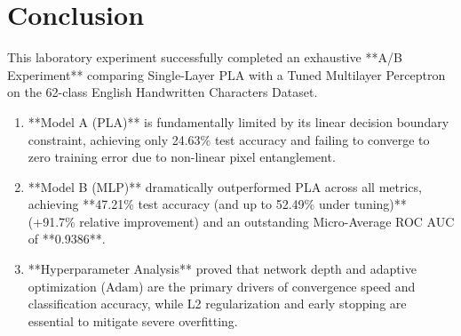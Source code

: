 \documentclass[12pt,a4paper]{article}
\begin{document}
\section{Conclusion}
This laboratory experiment successfully completed an exhaustive **A/B Experiment** comparing Single-Layer PLA with a Tuned Multilayer Perceptron on the 62-class English Handwritten Characters Dataset.
\begin{enumerate}[noitemsep]
    \item **Model A (PLA)** is fundamentally limited by its linear decision boundary constraint, achieving only 24.63\% test accuracy and failing to converge to zero training error due to non-linear pixel entanglement.
    \item **Model B (MLP)** dramatically outperformed PLA across all metrics, achieving **47.21\% test accuracy (and up to 52.49\% under tuning)** (+91.7\% relative improvement) and an outstanding Micro-Average ROC AUC of **0.9386**.
    \item **Hyperparameter Analysis** proved that network depth and adaptive optimization ($\text{Adam}$) are the primary drivers of convergence speed and classification accuracy, while L2 regularization and early stopping are essential to mitigate severe overfitting.
\end{enumerate}
\end{document}
